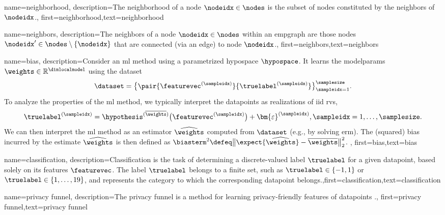 {{
{
	name={neighborhood},
	description={The neighborhood of a node $\nodeidx \in \nodes$ is 
	the subset of nodes constituted by the \gls{neighbors} of $\nodeidx$.},
	first={neighborhood},text={neighborhood} 
}


{
	name={neighbors},
	description={The neighbors of a node $\nodeidx \in \nodes$ 
	within an \gls{empgraph} are those nodes $\nodeidx' \in \nodes \setminus \{ \nodeidx\}$ that are connected (via an edge) to node $\nodeidx$.},
	first={neighbors},text={neighbors} 
}

{
	name={bias},
	description={Consider an \gls{ml} method using a parametrized \gls{hypospace} $\hypospace$. 
		It learns the \gls{modelparams} $\weights \in \mathbb{R}^{\dimlocalmodel}$ using the \gls{dataset} $$ \dataset=\big\{ \pair{\featurevec^{(\sampleidx)}}{\truelabel^{(\sampleidx)}} \big\}_{\sampleidx=1}^{\samplesize}.$$ 
		To analyze the properties of the \gls{ml} method, we typically interpret the \gls{datapoint}s as \gls{realization}s 
		of \gls{iid} \gls{rv}s, $$ \truelabel^{(\sampleidx)} = \hypothesis^{(\overline{\weights})}\big( \featurevec^{(\sampleidx)} \big) + \bm{\varepsilon}^{(\sampleidx)}, \sampleidx=1,\ldots,\samplesize.$$ 
		We can then interpret the \gls{ml} method as an estimator $\widehat{\weights}$ 
		computed from $\dataset$ (e.g., by solving \gls{erm}). The (squared) bias incurred by the estimate $\widehat{\weights}$ 
		is then defined as $\biasterm^{2} \defeq \big\| \expect \{ \widehat{\weights}  \}- \overline{\weights}\big\|_{2}^{2}$. },
first={bias},text={bias} 
}

{name={classification},
 description={Classification is the task of determining a 
 	discrete-valued label $\truelabel$ for a given \gls{datapoint}, based solely on its 
 	features $\featurevec$. The label $\truelabel$ belongs to a finite set, such as 
 	$\truelabel \in \{-1,1\}$ or $\truelabel \in \{1,\ldots,19\}$, and represents the 
 	category to which the corresponding \gls{datapoint} belongs.},first={classification},text={classification} 
}



{name={privacy funnel},
 description={The privacy funnel is a method for learning privacy-friendly \gls{feature}s 
	of \gls{datapoint}s \cite{PrivacyFunnel}.},
 first={privacy funnel},text={privacy funnel} 
}




}}
